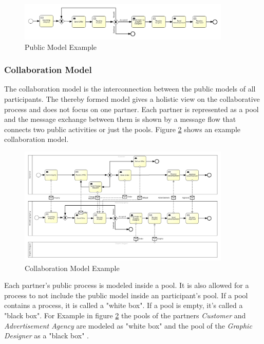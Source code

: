 \begin{figure}[H]
\centering
\includegraphics[width=0.9\textwidth]{src/images/public_process_agency.png}
\caption{Public Model Example}
\label{fig:publicModel}
\end{figure}

\subsubsection{Collaboration Model}
The collaboration model is the interconnection between the public models of all participants. The thereby formed model gives a holistic view on the collaborative process and does not focus on one partner. Each partner is represented as a pool and the message exchange between them is shown by a message flow that connects two public activities or just the pools. Figure \ref{fig:collabModel} shows an example collaboration model.

\begin{figure}[H]
\centering
\includegraphics[width=0.9\textwidth]{src/images/collab_advertisement.png}
\caption{Collaboration Model Example}
\label{fig:collabModel}
\end{figure}

Each partner's public process is modeled inside a pool. It is also allowed for a process to not include the public model inside an participant's pool. If a pool contains a process, it is called a "white box". If a pool is empty, it's called a "black box". For Example in figure \ref{fig:collabModel} the pools of the partners \textit{Customer} and \textit{Advertisement Agency} are modeled as "white box" and the pool of the \textit{Graphic Designer} as a "black box" \cite{BPMN20}.

